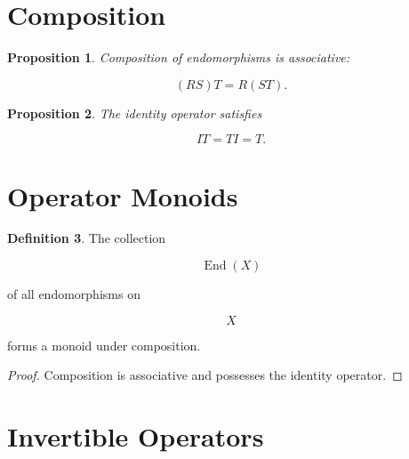\documentclass[11pt]{book}
\numberwithin{equation}{chapter}
\theoremstyle{definition}
\newtheorem{definition}{Definition}[chapter]
\theoremstyle{plain}
\newtheorem{proposition}[definition]{Proposition}
\begin{document}

\section{Composition}

\begin{proposition}

Composition of endomorphisms is associative:

\[
(RS)T
=
R(ST).
\]

\end{proposition}


\begin{proposition}

The identity operator satisfies

\[
IT
=
TI
=
T.
\]

\end{proposition}


\section{Operator Monoids}

\begin{definition}

The collection

\[
\operatorname{End}(X)
\]

of all endomorphisms on

\[
X
\]

forms a monoid under composition.

\end{definition}


\begin{proof}

Composition is associative and possesses the identity operator.

\end{proof}


\section{Invertible Operators}
\end{document}
